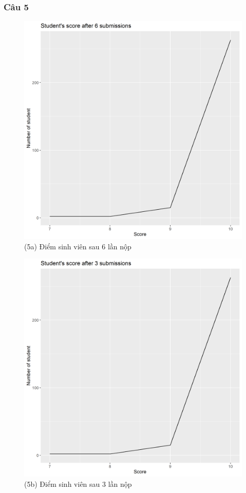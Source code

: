 \documentclass[a4paper]{article}
\theoremstyle{definition}
\begin{document}
\subsubsection{Câu 5}
\begin{figure}[!ht]
    \centering
    \includegraphics[scale=0.4]{Pics/q5a_file2.png}
    \caption{(5a) Điểm sinh viên sau 6 lần nộp}
    \label{fig:my_label}
\end{figure}
\begin{figure}[!ht]
    \centering
    \includegraphics[scale=0.4]{Pics/q5b_file2.png}
    \caption{(5b) Điểm sinh viên sau 3 lần nộp}
    \label{fig:my_label}
\end{figure}
\end{document}
